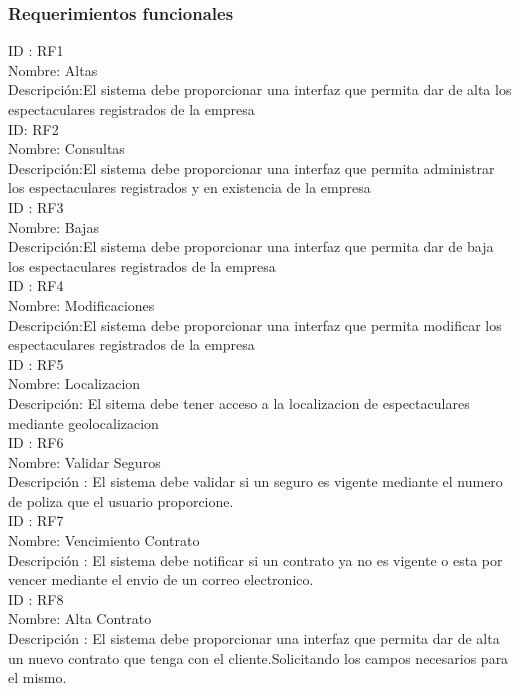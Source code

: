 \subsubsection{Requerimientos funcionales}

ID : RF1 \\
Nombre: Altas \\
Descripción:El sistema debe proporcionar una interfaz que permita dar de alta los espectaculares registrados de la empresa \\

ID: RF2 \\
Nombre: Consultas \\
Descripción:El sistema debe proporcionar una interfaz que permita administrar los espectaculares registrados y en existencia de la empresa \\

ID : RF3 \\
Nombre: Bajas \\
Descripción:El sistema debe proporcionar una interfaz que permita dar de baja los espectaculares registrados de la empresa \\

ID : RF4 \\
Nombre: Modificaciones \\
Descripción:El sistema debe proporcionar una interfaz que permita modificar los espectaculares registrados de la empresa \\

ID : RF5 \\
Nombre: Localizacion \\
Descripción: El sitema debe tener acceso a la localizacion de espectaculares mediante geolocalizacion   \\

ID : RF6 \\
Nombre: Validar Seguros \\
Descripción : El sistema debe validar si un seguro es vigente mediante el numero de poliza que el usuario proporcione. \\

ID : RF7 \\
Nombre: Vencimiento Contrato \\
Descripción :  El sistema debe notificar si un contrato ya no es vigente o esta por vencer mediante el envio de un correo electronico.   \\

ID : RF8 \\
Nombre: Alta Contrato \\
Descripción :  El sistema debe proporcionar una interfaz que permita dar de alta un nuevo contrato que tenga con el cliente.Solicitando los campos necesarios para el mismo. \\

